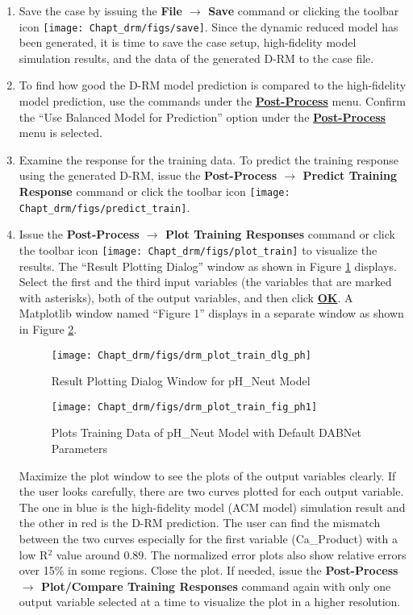 \begin{enumerate}
	\item Save the case by issuing the \textbf{File $\rightarrow$ Save} command or clicking the toolbar icon \texttt{[image: Chapt\_drm/figs/save]}.  Since the dynamic reduced model has been generated, it is time to save the case setup, high-fidelity model simulation results, and the data of the generated D-RM to the case file.
	\item To find how good the D-RM model prediction is compared to the high-fidelity model prediction, use the commands under the \textbf{\underline{Post-Process}} menu.  Confirm the ``Use Balanced Model for Prediction'' option under the \textbf{\underline{Post-Process}} menu is selected.
	\item Examine the response for the training data.  To predict the training response using the generated D-RM, issue the \textbf{Post-Process $\rightarrow$ Predict Training Response} command or click the toolbar icon \texttt{[image: Chapt\_drm/figs/predict\_train]}.
	\item Issue the \textbf{Post-Process $\rightarrow$ Plot Training Responses} command or click the toolbar icon \texttt{[image: Chapt\_drm/figs/plot\_train]} to visualize the results.  The ``Result Plotting Dialog'' window as shown in Figure \ref{fig.drm_plot_train_dlg_ph} displays.  Select the first and the third input variables (the variables that are marked with asterisks), both of the output variables, and then click \textbf{\underline{OK}}.  A Matplotlib window named ``Figure 1'' displays in a separate window as shown in Figure \ref{fig.drm_plot_train_fig_ph1}.
	\begin{figure}[H]
		\begin{center}
			\texttt{[image: Chapt\_drm/figs/drm\_plot\_train\_dlg\_ph]}
			\caption{Result Plotting Dialog Window for pH\_Neut Model}
			\label{fig.drm_plot_train_dlg_ph}
		\end{center}
	\end{figure}
	\begin{figure}[H]
		\begin{center}
			\texttt{[image: Chapt\_drm/figs/drm\_plot\_train\_fig\_ph1]}
			\caption{Plots Training Data of pH\_Neut Model with Default DABNet Parameters}
			\label{fig.drm_plot_train_fig_ph1}
		\end{center}
	\end{figure}
	Maximize the plot window to see the plots of the output variables clearly.  If the user looks carefully, there are two curves plotted for each output variable.  The one in blue is the high-fidelity model (ACM model) simulation result and the other in red is the D-RM prediction.  The user can find the mismatch between the two curves especially for the first variable (Ca\_Product) with a low R$^2$ value around 0.89.  The normalized error plots also show relative errors over 15\% in some regions.  Close the plot.  If needed, issue the \textbf{Post-Process $\rightarrow$ Plot/Compare Training Responses} command again with only one output variable selected at a time to visualize the plot in a higher resolution.

\end{enumerate}
